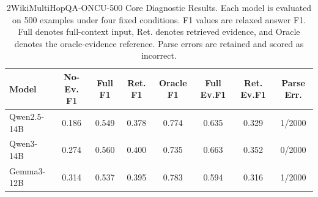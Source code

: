 \begin{table}[!t]
\renewcommand{\arraystretch}{1.12}
\caption{2WikiMultiHopQA-ONCU-500 Core Diagnostic Results. Each model is evaluated on 500 examples under four fixed conditions. F1 values are relaxed answer F1. Full denotes full-context input, Ret. denotes retrieved evidence, and Oracle denotes the oracle-evidence reference. Parse errors are retained and scored as incorrect.}
\label{tab:twowiki500_main_results}
\centering
\scriptsize
\setlength{\tabcolsep}{4pt}
\begin{tabular}{lccccccc}
\toprule
Model & No-Ev. F1 & Full F1 & Ret. F1 & Oracle F1 & Full Ev.F1 & Ret. Ev.F1 & Parse Err. \\
\midrule
Qwen2.5-14B & 0.186 & 0.549 & 0.378 & 0.774 & 0.635 & 0.329 & 1/2000 \\
Qwen3-14B & 0.274 & 0.560 & 0.400 & 0.735 & 0.663 & 0.352 & 0/2000 \\
Gemma3-12B & 0.314 & 0.537 & 0.395 & 0.783 & 0.594 & 0.316 & 1/2000 \\
\bottomrule
\end{tabular}
\end{table}
